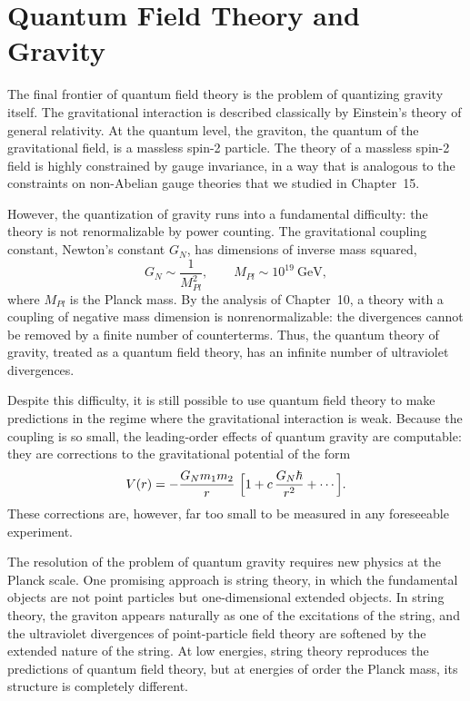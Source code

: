 \section{Quantum Field Theory and Gravity}

The final frontier of quantum field theory is the problem of quantizing
gravity itself.  The gravitational interaction is described classically by
Einstein's theory of general relativity.  At the quantum level, the
graviton, the quantum of the gravitational field, is a massless spin-2
particle.  The theory of a massless spin-2 field is highly constrained by
gauge invariance, in a way that is analogous to the constraints on
non-Abelian gauge theories that we studied in Chapter~15.

However, the quantization of gravity runs into a fundamental difficulty: the
theory is not renormalizable by power counting.  The gravitational coupling
constant, Newton's constant $G_N$, has dimensions of inverse mass squared,
\begin{equation}
  G_N \sim \frac{1}{M_{Pl}^2},
  \qquad M_{Pl} \sim 10^{19}\ \mathrm{GeV} ,
  \label{eq:22.19}
\end{equation}
where $M_{Pl}$ is the Planck mass.  By the analysis of Chapter~10, a theory
with a coupling of negative mass dimension is nonrenormalizable: the
divergences cannot be removed by a finite number of counterterms.  Thus, the
quantum theory of gravity, treated as a quantum field theory, has an
infinite number of ultraviolet divergences.

Despite this difficulty, it is still possible to use quantum field theory to
make predictions in the regime where the gravitational interaction is weak.
Because the coupling is so small, the leading-order effects of quantum
gravity are computable: they are corrections to the gravitational potential
of the form
\begin{equation}
  V(r) = -\frac{G_N m_1 m_2}{r}\ \Bigl[ 1 + c\,
    \frac{G_N\hbar}{r^2} + \cdots \Bigr] .
  \label{eq:22.20}
\end{equation}
These corrections are, however, far too small to be measured in any
foreseeable experiment.

The resolution of the problem of quantum gravity requires new physics at the
Planck scale.  One promising approach is string theory, in which the
fundamental objects are not point particles but one-dimensional extended
objects.  In string theory, the graviton appears naturally as one of the
excitations of the string, and the ultraviolet divergences of point-particle
field theory are softened by the extended nature of the string.  At low
energies, string theory reproduces the predictions of quantum field theory,
but at energies of order the Planck mass, its structure is completely
different.


